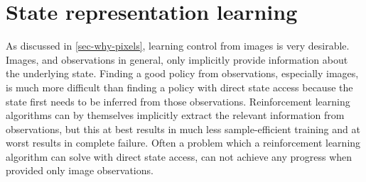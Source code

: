 



\chapter{State representation learning}
\label{ch-srl-background}


As discussed in \ref{sec-why-pixels}, learning control from images is 
very desirable. Images, and observations in general, only implicitly 
provide information about the underlying state. 
Finding a good policy from observations, especially images,
is much more difficult than finding a policy with direct state access
because the state first needs to be inferred from those observations.
Reinforcement learning algorithms can by themselves implicitly extract
the relevant information from observations, but this at best results
in much less sample-efficient training and at worst results
in complete failure.
Often a problem which a reinforcement learning algorithm can solve
with direct state access, can not achieve any progress when
provided only image observations. \\

